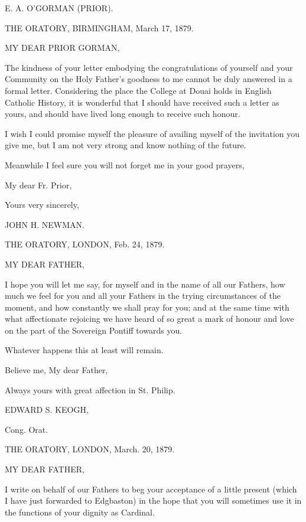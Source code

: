 E. A. O'GORMAN (PRIOR).


THE ORATORY, BIRMINGHAM,
March 17, 1879.

MY DEAR PRIOR
GORMAN,

The kindness of your letter embodying the congratulations of yourself
and your Community on the Holy Father's goodness to me cannot be duly
answered in a formal letter. Considering the place the College at
Douai holds in English Catholic History, it is wonderful that I should
have received such a letter as yours, and should have lived long
enough to receive such honour.

I wish I could promise myself the pleasure of availing myself
of the invitation you give me, but I am not very strong and know
nothing of the future.

Meanwhile I feel sure you will not forget me in your good prayers,

My dear Fr. Prior,

Yours very sincerely,

JOHN H. NEWMAN.


THE ORATORY, LONDON,
Feb. 24, 1879.

MY DEAR FATHER,

I hope you will let me say, for myself and in the name of all our
Fathers, how much we feel for you and all your Fathers in the trying
circumstances of the moment, and how constantly we shall pray for you;
and at the same time with what affectionate rejoicing we have heard of
so great a mark of honour and love on the part of the Sovereign
Pontiff towards you.

Whatever happens this at least will remain.

Believe me, My dear Father,

Always yours with great affection in St. Philip.

EDWARD S. KEOGH,

Cong. Orat.


THE ORATORY, LONDON,
March. 20, 1879.

MY DEAR FATHER,

I write on behalf of our Fathers to beg your acceptance of a little
present (which I have just forwarded to Edgbaston) in the hope that
you will sometimes use it in the functions of your dignity as
Cardinal.


